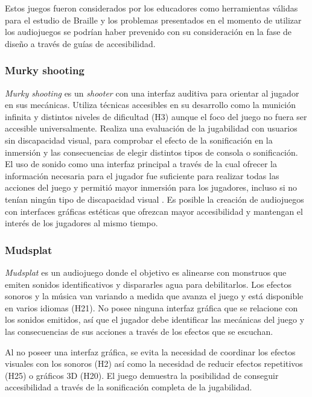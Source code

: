 Estos juegos fueron considerados por los educadores como herramientas válidas para el estudio de Braille \cite[p ~238]{araujoDesignUsabilityBraillebased2016} y los problemas presentados en el momento de utilizar los audiojuegos se podrían haber prevenido con su consideración en la fase de diseño a través de guías de accesibilidad. \\

\subsubsection{Murky shooting}
\textit{Murky shooting} es un \textit{shooter} con una interfaz auditiva para orientar al jugador en sus mecánicas. Utiliza técnicas accesibles en su desarrollo como la munición infinita y distintos niveles de dificultad (H3) aunque el foco del juego no fuera ser accesible universalmente. Realiza una evaluación de la jugabilidad con usuarios sin discapacidad visual, para comprobar el efecto de la sonificación en la inmersión y las consecuencias de elegir distintos tipos de consola o sonificación.
\cite{cordeiroMurkyShootingUse2012}\\

El uso de sonido como una interfaz principal a través de la cual ofrecer la información necesaria para el jugador fue suficiente para realizar todas las acciones del juego y permitió mayor inmersión para los jugadores, incluso si no tenían ningún tipo de discapacidad visual \cite{cordeiroMurkyShootingUse2012}. Es posible la creación de audiojuegos con interfaces gráficas estéticas que ofrezcan mayor accesibilidad y mantengan el interés de los jugadores al mismo tiempo.\\

\subsubsection{Mudsplat}
\textit{Mudsplat} es un audiojuego donde el objetivo es alinearse con monstruos que emiten sonidos identificativos y dispararles agua para debilitarlos. Los efectos sonoros y la música van variando a medida que avanza el juego y está disponible en varios idiomas (H21). No posee ninguna interfaz gráfica que se relacione con los sonidos emitidos, así que el jugador debe identificar las mecánicas del juego y las consecuencias de sus acciones a través de los efectos que se escuchan.\\ \cite{audiogamesNewPerspectives}

Al no poseer una interfaz gráfica, se evita la necesidad de coordinar los efectos visuales con los sonoros (H2) así como la necesidad de reducir efectos repetitivos (H25) o gráficos 3D (H20). El juego demuestra la posibilidad de conseguir accesibilidad a través de la sonificación completa de la jugabilidad.\\


